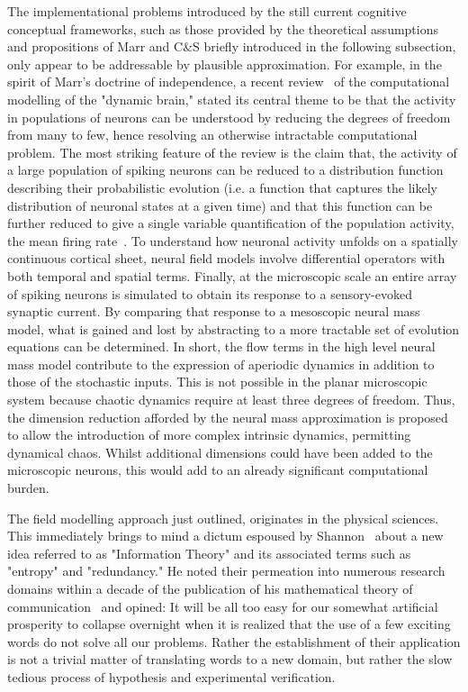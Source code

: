 \documentclass{article}
\begin{document}
The implementational problems introduced by the still current cognitive conceptual frameworks, such as those provided by the theoretical assumptions and propositions of Marr and C\&S briefly introduced in the following subsection, only appear to be addressable by plausible approximation. For example, in the spirit of Marr's doctrine of independence, a recent review~\cite{deco08} of the computational modelling of the "dynamic brain," stated its central theme to be that the activity in populations of neurons can be understood by reducing the degrees of freedom from many to few, hence resolving an otherwise intractable computational problem. The most striking feature of the review is the claim that, the activity of a large population of spiking neurons can be reduced to a distribution function describing their probabilistic evolution (i.e. a function that captures the likely distribution of neuronal states at a given time) and that this function can be further reduced to give a single variable quantification of the population activity, the mean firing rate~\cite{deco08}. To understand how neuronal activity unfolds on a spatially continuous cortical sheet, neural field models involve differential operators with both temporal and spatial terms. Finally, at the microscopic scale an entire array of spiking neurons is simulated to obtain its response to a sensory-evoked synaptic current. By comparing that response to a mesoscopic neural mass model, what is gained and lost by abstracting to a more tractable set of evolution equations can be determined. In short, the flow terms in the high level neural mass model contribute to the expression of aperiodic dynamics in addition to those of the stochastic inputs. This is not possible in the planar microscopic system because chaotic dynamics require at least three degrees of freedom. Thus, the dimension reduction afforded by the neural mass approximation is proposed to allow the introduction of more complex intrinsic dynamics, permitting dynamical chaos. Whilst additional dimensions could have been added to the microscopic neurons, this would add to an already significant computational burden.

The field modelling approach just outlined, originates in the physical sciences. This immediately brings to mind a dictum espoused by Shannon~\cite{shannon56} about a new idea referred to as "Information Theory" and its associated terms such as "entropy" and "redundancy." He noted their permeation into numerous research domains within a decade of the publication of his mathematical theory of communication~\cite{shannon48} and opined: It will be all too easy for our somewhat artificial prosperity to collapse overnight when it is realized that the use of a few exciting words do not solve all our problems. Rather the establishment of their application is not a trivial matter of translating words to a new domain, but rather the slow tedious process of hypothesis and experimental verification.
\end{document}
